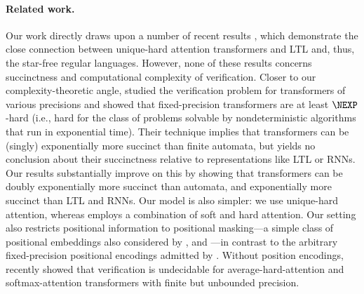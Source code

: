 \documentclass{article} %
\begin{document}
\paragraph{Related work.} 
Our work directly draws upon a number of recent results
\citep{YangCA24,barcelo2024logical,tale,LC25}, which demonstrate the close connection
between unique-hard attention transformers and LTL and, thus, the star-free regular languages.
However, none of these results concerns succinctness and computational complexity of verification.
Closer to our complexity-theoretic angle, \citet{SAL25} studied the verification problem for transformers of various precisions and showed that fixed-precision transformers are at least $\NEXP$-hard (i.e., hard for the class of problems solvable by nondeterministic algorithms that run in exponential time). Their technique implies that transformers can be (singly) exponentially more succinct than finite automata, but yields no conclusion about their succinctness relative to representations like LTL or RNNs.
Our results substantially improve on this by showing that transformers can be doubly exponentially more succinct than automata, and exponentially more succinct than LTL and RNNs. Our model is also simpler: we use unique-hard attention, whereas \citet{SAL25} employs a combination of soft and hard attention.
Our setting also restricts positional information to positional masking---a simple class of positional embeddings also considered by \citet{YangCA24}, \citet{tale} and \citet{LC25}---in contrast to the arbitrary fixed-precision positional encodings admitted by \citet{SAL25}. 
Without position encodings, \citet{counting-power} recently showed that verification is undecidable for average-hard-attention and softmax-attention transformers with finite but unbounded precision.
\end{document}
